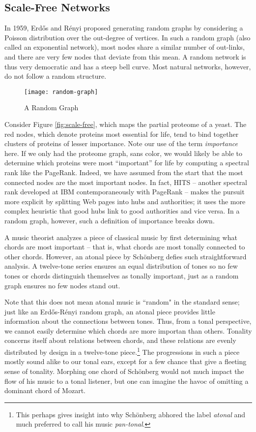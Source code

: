 \documentclass[../exploring-pagerank.tex]{subfiles}
\begin{document}
    \subsection{Scale-Free Networks}
    In 1959, Erdős and Rényi proposed generating random graphs by considering a Poisson distribution over the out-degree of vertices. In such a random graph (also called an exponential network), most nodes share a similar number of out-links, and there are very few nodes that deviate from this mean. A random network is thus very democratic and has a steep bell curve. Most natural networks, however, do not follow a random structure.
    \begin{figure}
        \centering
        \texttt{[image: random-graph]}
        \caption{A Random Graph \cite{RandomGeometricGraph}}
        \label{fig:random}
    \end{figure}
    Consider Figure \ref{fig:scale-free}, which maps the partial proteome of a yeast. The red nodes, which denote proteins most essential for life, tend to bind together clusters of proteins of lesser importance. Note our use of the term \textit{importance} here. If we only had the proteome graph, sans color, we would likely be able to determine which proteins were most ``important'' for life by computing a spectral rank like the PageRank. Indeed, we have assumed from the start that the most connected nodes are the most important nodes. In fact, HITS -- another spectral rank developed at IBM contemporaneously with PageRank -- makes the pursuit more explicit by splitting Web pages into hubs and authorities; it uses the more complex heuristic that good hubs link to good authorities and vice versa. In a random graph, however, such a definition of importance breaks down.

    A music theorist analyzes a piece of classical music by first determining what chords are most important -- that is, what chords are most tonally connected to other chords. However, an atonal piece by Schönberg defies such straightforward analysis. A twelve-tone series ensures an equal distribution of tones so no few tones or chords distinguish themselves as tonally important, just as a random graph ensures no few nodes stand out.

    Note that this does not mean atonal music is ``random" in the standard sense; just like an Erdős-Rényi random graph, an atonal piece provides little information about the connections between tones. Thus, from a tonal perspective, we cannot easily determine which chords are more importan than others. Tonality concerns itself about relations between chords, and these relations are evenly distributed by design in a twelve-tone piece.\footnote{This perhaps gives insight into why Schönberg abhored the label \textit{atonal} and much preferred to call his music \textit{pan-tonal}.} The progressions in such a piece mostly sound alike to our tonal ears, except for a few chance that give a fleeting sense of tonality. Morphing one chord of Schönberg would not much impact the flow of his music to a tonal listener, but one can imagine the havoc of omitting a dominant chord of Mozart.
\end{document}
